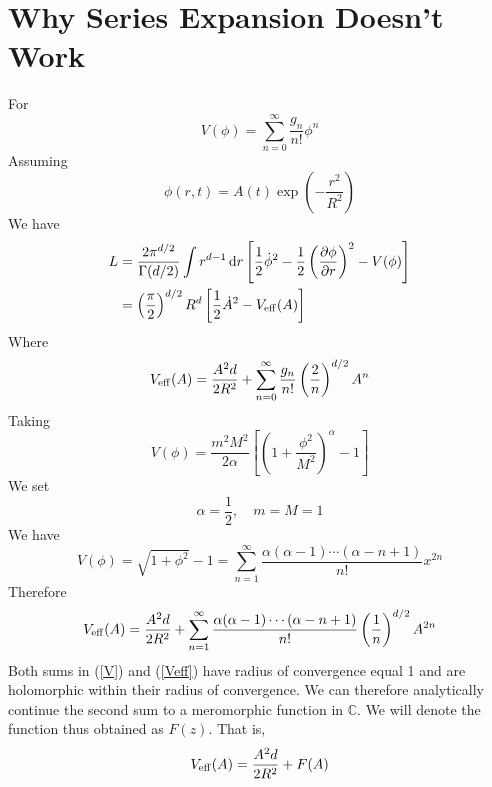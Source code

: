 \documentclass{report}
\begin{document}
\section{Why Series Expansion Doesn't Work}
For
\begin{equation}
  V(\phi)=\sum_{n=0}^\infty \frac{g_n}{n!}\phi^n
\end{equation}
Assuming
\begin{equation}
  \phi(r,t) = A(t) \exp\left(-\frac{r^2}{R^2}\right)
\end{equation}
We have
\begin{equation}
  \begin{split}
    L &= \frac{2\pi^{d/2}}{\Gamma(d/2)}\int r^{d-1}\,\mathrm{d}r\left[\frac{1}{2}\dot{\phi}^2 -
      \frac{1}{2}\left(\frac{\partial\phi}{\partial r}\right)^2-V(\phi)\right]\\
    &= \left(\frac{\pi}{2}\right)^{d/2}R^d\left[\frac{1}{2}\dot{A}^2 - V_{\rm eff}(A)\right]
  \end{split}
\end{equation}
Where
\begin{equation}
  V_{\rm eff}(A) = \frac{A^2d}{2R^2} +
  \sum_{n=0}^\infty \frac{g_n}{n!}\left(\frac{2}{n}\right)^{d/2} A^n
\end{equation}
Taking
\begin{equation}
  V(\phi) = \frac{m^2M^2}{2\alpha}\left[\left(1+\frac{\phi^2}{M^2}\right)^\alpha-1\right]
\end{equation}
We set
\begin{equation}
  \alpha=\frac{1}{2},\quad m=M=1
\end{equation}
We have
\begin{equation}\label{V}
  V(\phi)=\sqrt{1+\phi^2}-1=\sum_{n=1}^\infty\frac{\alpha(\alpha-1)\cdots(\alpha-n+1)}{n!}x^{2n}
\end{equation}
Therefore
\begin{equation}\label{Veff}
  V_{\rm eff}(A)=\frac{A^2d}{2R^2} + \sum_{n=1}^\infty\frac{\alpha(\alpha-1)\cdots(\alpha-n+1)}{n!}
  \left(\frac{1}{n}\right)^{d/2}A^{2n}
\end{equation}
Both sums in (\ref{V}) and (\ref{Veff}) have radius of convergence equal 1 and are holomorphic within their radius of convergence. We can therefore analytically continue the second sum to a meromorphic function in $\mathbb{C}$. We will denote the function thus obtained as $F(z)$. That is,
\begin{equation}
  V_{\rm eff}(A) = \frac{A^2d}{2R^2} + F(A)
\end{equation}
\end{document}
